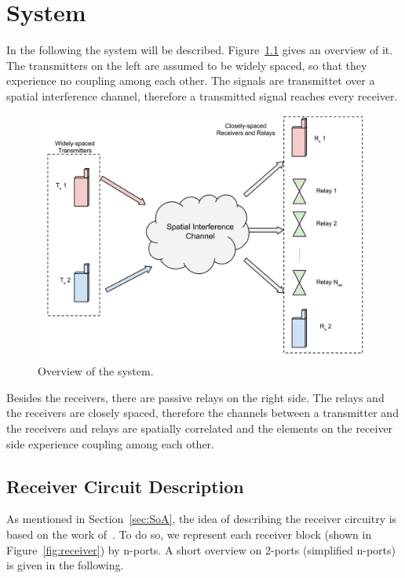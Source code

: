 \chapter{System}
\label{sec:system}

In the following the system will be described.
Figure~\ref{fig:system} gives an overview of it.
The transmitters on the left are assumed to be widely spaced, so that they experience no coupling among each other.
The signals are transmittet over a spatial interference channel, therefore a transmitted signal reaches every receiver.
\begin{figure}[h]
\begin{center}
\includegraphics[width=\textwidth]{images/System.png}
\caption{Overview of the system.}
\label{fig:system}
\end{center}
\end{figure}

Besides the receivers, there are passive relays on the right side.
The relays and the receivers are closely spaced, therefore the channels between a transmitter and the receivers and relays are spatially correlated and the elements on the receiver side experience coupling among each other.

\section{Receiver Circuit Description}
\label{sec:network_description}
As mentioned in Section~\ref{sec:SoA}, the idea of describing the receiver circuitry is based on the work of~\cite{Nossek}.
To do so, we represent each receiver block (shown in Figure~\ref{fig:receiver}) by n-ports.
A short overview on 2-ports (simplified n-ports) is given in the following.

